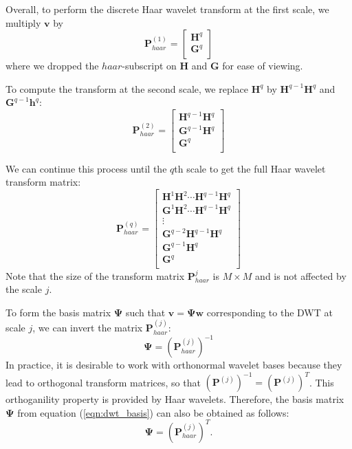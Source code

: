 Overall, to perform the discrete Haar wavelet transform at the first scale, we multiply $\bm v$ by
\begin{equation*}
  \bm P^{(1)}_{haar} = \begin{bmatrix}
    \bm H^q \\
    \bm G^q \\
  \end{bmatrix}
\end{equation*}
where we dropped the $haar$-subscript on $\bm H$ and $\bm G$ for ease of viewing.

To compute the transform at the second scale, we replace $\bm H^q$ by $\bm H^{q-1}\bm H^q$ and $\bm G^{q-1}\bm h^q$:
\begin{equation*}
  \bm P^{(2)}_{haar} = \begin{bmatrix}
    \bm H^{q-1} \bm H^q \\
    \bm G^{q-1} \bm H^q \\
    \bm G^q \\
  \end{bmatrix}
\end{equation*}

We can continue this process until the $q$th scale to get the full Haar wavelet transform matrix:
\begin{equation*}
  \bm P^{(q)}_{haar} = \begin{bmatrix}
    \bm H^1 \bm H^2 \cdots \bm H^{q-1} \bm H^q \\
    \bm G^1 \bm H^2 \cdots \bm H^{q-1} \bm H^q \\
    \vdots\\
    \bm G^{q-2} \bm H^{q-1} \bm H^q \\
    \bm G^{q-1} \bm H^q \\
    \bm G^q \\
  \end{bmatrix}
\end{equation*}
Note that the size of the transform matrix $\bm P^j_{haar}$ is $M\times M$ and is not affected by the scale $j$.

To form the basis matrix $\bm\Psi$ such that $\bm v = \bm\Psi\bm w$ corresponding to the DWT at scale $j$, we can invert the matrix $\bm P^{(j)}_{haar}$:
\begin{equation}
  \label{eqn:dwt_basis}
  \bm\Psi = \left(\bm P^{(j)}_{haar}\right)^{-1}
\end{equation}
In practice, it is desirable to work with orthonormal wavelet bases because they lead to orthogonal transform matrices, so that $\left(\bm P^{(j)}\right)^{-1}=\left(\bm P^{(j)}\right)^T$.
This orthoganility property is provided by Haar wavelets.
Therefore, the basis matrix $\bm\Psi$ from equation (\ref{eqn:dwt_basis}) can also be obtained as follows:
\begin{equation}
  \label{eqn:haar1_basis}
  \bm\Psi = \left(\bm P^{(j)}_{haar}\right)^T.
\end{equation}


